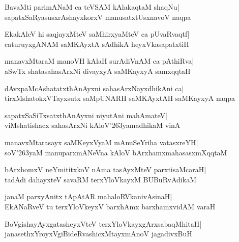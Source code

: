 \documentclass[twoside,12pt,openright]{book}
\def\S{\char'263}
\newcounter{shloka}[chapter]
\begin{document}
\begin{shloka}%
BavaMti parimANaM ca teVSAM kAlakaqtaM shaqNu|\\
sapatxSaRyasusxrAshayxkorxV manusatxtUsxnavoV naqpa
\end{shloka}

\begin{shloka}%
EkakAleV hi saqjayxMteV saMhirxyaMteV ca pUvaRvaqtf|\\
caturuyxgANAM saMKAyxtA sAdhikA heyxVkasapatxtiH
\end{shloka}

\begin{shloka}%
manavxMtaraM manoVH kAlaH surAdiVnAM ca pAthiRva|\\
aSwTx shatasahasArxNi divayxyA saMKayxyA samxqqtaH
\end{shloka}

\begin{shloka}%
dAvxpaMcAshatatxthAnAyxni sahasArxNayxdhikAni ca|\\
tirxMshatokxVTayxsutx saMpUNARH saMKAyxtAH saMKayxyA naqpa
\end{shloka}

\begin{shloka}%
sapatxSaSiTxsatxthAnAyxni niyutAni mahAmateV|\\
viMshatishacx sahasArxNi kAloV\S yamadhikaM vinA
\end{shloka}

\begin{shloka}%
manavxMtarasayx saMKeyxVyaM mAnuSeYriha vatasxreYH|\\
soV\S yaM manuparxmANeVna kAloV bArxhamxmahasasxmXqqtaM
\end{shloka}

\begin{shloka}%
bArxhomxV neYmititxkoV nAma tasAyxMteV parxtisaMcaraH|\\
tadAdi dahayxteV savaRM terxYloVkayxM BUBuRvAdikaM
\end{shloka}

\begin{shloka}%
janaM parxyAnitx tApAtAR mahaloRVkanivAsinaH|\\
EkANaRveV tu terxYloVkeyxV barxhAmx barxhamxvidAM varaH
\end{shloka}

\begin{shloka}%
BoVgishayAyxgatasheyxVteV terxYloVkayxgArxsabaqMhitaH|\\
janasethxYroyxVgiBideRvashicxMtayxmAnoV jagadivxBuH
\end{shloka}
\end{document}
